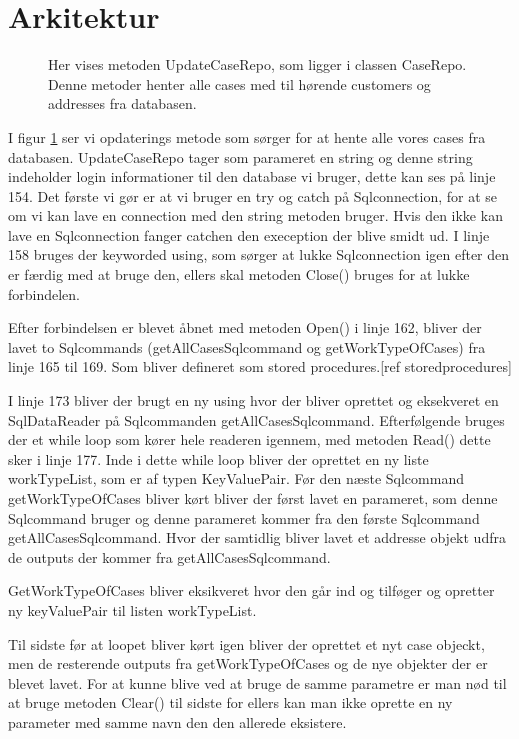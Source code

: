 \newpage
\section{Arkitektur}

\begin{figure}[H]
    \caption{Her vises metoden UpdateCaseRepo, som ligger i classen CaseRepo. Denne metoder henter alle cases med til hørende customers og addresses fra databasen.}
    \label{fig:UpdateCaseRepo}
\end{figure}

I figur \ref{fig:UpdateCaseRepo} ser vi opdaterings metode som sørger for at hente alle vores cases fra databasen. UpdateCaseRepo tager som parameret en string og denne string indeholder login informationer til den database vi bruger, dette kan ses på linje 154.
Det første vi gør er at vi bruger en try og catch på Sqlconnection, for at se om vi kan lave en connection med den string metoden bruger. Hvis den ikke kan lave en Sqlconnection fanger catchen den exeception der blive smidt ud. I linje 158 bruges der keyworded using, som sørger at lukke Sqlconnection igen efter den er færdig med at bruge den, ellers skal metoden Close() bruges for at lukke forbindelen.

Efter forbindelsen er blevet åbnet med metoden Open() i linje 162, bliver der lavet to Sqlcommands (getAllCasesSqlcommand og getWorkTypeOfCases) fra linje 165 til 169. Som bliver defineret som stored procedures.[ref storedprocedures]

I linje 173 bliver der brugt en ny using hvor der bliver oprettet og eksekveret en SqlDataReader på Sqlcommanden getAllCasesSqlcommand. Efterfølgende bruges der et while loop som kører hele readeren igennem, med metoden Read() dette sker i linje 177. Inde i dette while loop bliver der oprettet en ny liste workTypeList, som er af typen KeyValuePair.
Før den næste Sqlcommand getWorkTypeOfCases bliver kørt bliver der først lavet en parameret, som denne Sqlcommand bruger og denne parameret kommer fra den første Sqlcommand getAllCasesSqlcommand. Hvor der samtidlig bliver lavet et addresse objekt udfra de outputs der kommer fra getAllCasesSqlcommand.

GetWorkTypeOfCases bliver eksikveret hvor den går ind og tilføger og opretter ny keyValuePair til listen workTypeList.

Til sidste før at loopet bliver kørt igen bliver der oprettet et nyt case objeckt, men de resterende outputs fra  getWorkTypeOfCases og de nye objekter der er blevet lavet.
For at kunne blive ved at bruge de samme parametre er man nød til at bruge metoden Clear() til sidste for ellers kan man ikke oprette en ny parameter med samme navn den den allerede eksistere.
